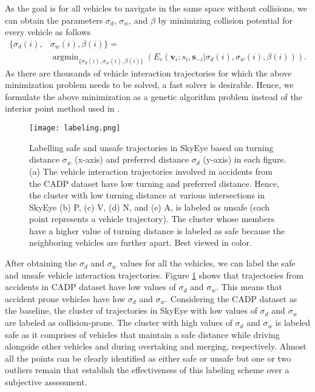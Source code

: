 \documentclass[final,journal]{IEEEtran}
\DeclareMathOperator*{\argminA}{argmin}
\begin{document}
As the goal is for all vehicles to navigate in the same space without collisions, we can obtain the parameters $\sigma_d$, $\sigma_w$, and $\beta$ by minimizing collision potential for every vehicle as follows
\begin{equation}
\begin{split}    
\{\sigma_d(i), & \sigma_w(i), \beta(i)\} = \\
    & \argminA_{\{\sigma_d(i), \sigma_w(i), \beta(i)\}} \left ( E_{c}(\mathbf{v}_i; s_i, \mathbf{s}_{-i}| \sigma_d(i), \sigma_w(i), \beta(i))\right ).
\end{split}
\end{equation}
As there are thousands of vehicle interaction trajectories for which the above minimization problem needs to be solved, a fast solver is desirable. Hence, we formulate the above minimization as a genetic algorithm problem instead of the interior point method used in \cite{social_etiquette}.
\begin{figure}
    \centering
    \texttt{[image: labeling.png]}
    \caption{Labelling safe and unsafe trajectories in SkyEye based on turning distance $\sigma_w$ (x-axis) and preferred distance $\sigma_d$ (y-axis) in each figure. (a) The vehicle interaction trajectories involved in accidents from the CADP dataset have low turning and preferred distance. Hence, the cluster with low turning distance at various intersections in SkyEye (b) P, (c) V, (d) N, and (e) A, is labeled as unsafe (each point represents a vehicle trajectory). The cluster whose members have a higher value of turning distance is labeled as safe because the neighboring vehicles are further apart. Best viewed in color.}
    \label{block_labeling}
\end{figure}
After obtaining the $\sigma_d$  and $\sigma_w$ values for all the vehicles, we can label the safe and unsafe vehicle interaction trajectories. Figure \ref{block_labeling} shows that trajectories from accidents in CADP dataset \cite{cadp} have low values of $\sigma_d$ and $\sigma_w$.  This means that accident prone vehicles have low $\sigma_d$ and $\sigma_w$. Considering the CADP dataset as the baseline, the cluster of trajectories in SkyEye with low values of $\sigma_d$ and $\sigma_w$ are labeled as collision-prone. The cluster with high values of $\sigma_d$ and $\sigma_w$ is labeled safe as it comprises of vehicles that maintain a safe distance while driving alongside other vehicles and during overtaking and merging, respectively. Almost all the points can be clearly identified as either safe or unsafe but one or two outliers remain that establish the effectiveness of this labeling scheme over a subjective assessment.
\end{document}
